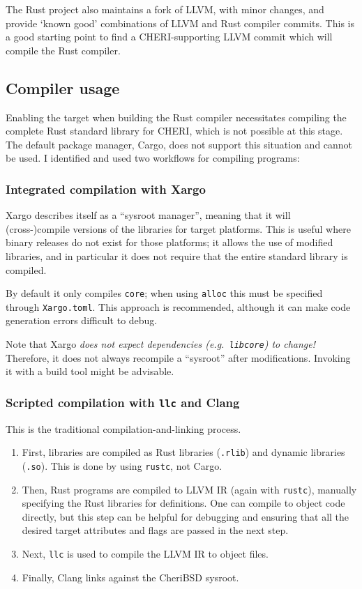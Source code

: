 \documentclass[dissertation.tex]{subfiles}
\begin{document}
The Rust project also maintains a fork of LLVM, with minor changes, and
provide `known good' combinations of LLVM and Rust compiler commits.
This is a good starting point to find a CHERI-supporting LLVM commit
which will compile the Rust compiler.


\subsection{Compiler usage}
Enabling the \cuf target when building the Rust compiler necessitates
compiling the complete Rust standard library for CHERI, which is not
possible at this stage.
The default package manager, Cargo, does not support this situation and
cannot be used.
I identified and used two workflows for compiling programs:

\subsubsection{Integrated compilation with Xargo}
Xargo describes itself as a ``sysroot manager'', meaning that it will
(cross-)compile versions of the libraries for target platforms.
This is useful where binary releases do not exist for those platforms;
it allows the use of modified libraries, and in particular it does not
require that the entire standard library is compiled.

By default it only compiles \texttt{core}; when using \texttt{alloc}
this must be specified through \texttt{Xargo.toml}.
This approach is recommended, although it can make code generation
errors difficult to debug.

Note that Xargo \emph{does not expect dependencies (e.g.\
\texttt{libcore}) to change!}
Therefore, it does not always recompile a ``sysroot'' after
modifications.
Invoking it with a build tool might be advisable.

\subsubsection{Scripted compilation with \texttt{llc} and Clang}
This is the traditional compilation-and-linking process.

\begin{enumerate}
    \item First, libraries are compiled as Rust libraries
    (\texttt{.rlib}) and dynamic libraries (\texttt{.so}).
    This is done by using \texttt{rustc}, not Cargo.
    \item Then, Rust programs are compiled to LLVM IR (again with
    \texttt{rustc}), manually specifying the Rust libraries for
    definitions.
    One can compile to object code directly, but this step can be
    helpful for debugging and ensuring that all the desired target
    attributes and flags are passed in the next step.
    \item Next, \texttt{llc} is used to compile the LLVM IR to object
    files.
    \item Finally, Clang links against the CheriBSD sysroot.
\end{enumerate}
\end{document}

